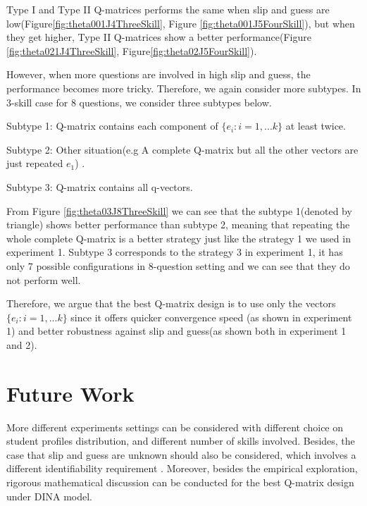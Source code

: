\documentclass{edm_template}
\begin{document}
Type I and Type II Q-matrices performs the same when slip and guess are low(Figure\ref{fig:theta001J4ThreeSkill}, Figure \ref{fig:theta001J5FourSkill}), but when they get higher, Type II Q-matrices show a better performance(Figure \ref{fig:theta021J4ThreeSkill}, Figure\ref{fig:theta02J5FourSkill}).

However, when more questions are involved in high slip and guess, the performance becomes more tricky. Therefore, we again consider more subtypes. In 3-skill case for 8 questions, we consider three subtypes below. 

Subtype 1: Q-matrix contains each component of $\{e_{i}:i=1,...k\}$ at least twice. 

Subtype 2: Other situation(e.g A complete Q-matrix but all the other vectors are just repeated $e_1$)
.

Subtype 3: Q-matrix contains all q-vectors.

From Figure \ref{fig:theta03J8ThreeSkill} we can see that the subtype 1(denoted by triangle) shows better performance than subtype 2, meaning that repeating the whole complete Q-matrix is a better strategy just like the strategy 1 we used in experiment 1. Subtype 3 corresponds to the strategy 3 in experiment 1, it has only 7 possible configurations in 8-question setting and we can see that they do not perform well.

Therefore, we argue that the best Q-matrix design is to use only the vectors $\{e_{i}:i=1,...k\}$ since it offers quicker convergence speed (as shown in experiment 1) and better robustness against slip and guess(as shown both in experiment 1 and 2).

\section{Future Work}
More different experiments settings can be considered with different choice on student profiles distribution, and different number of skills involved. Besides, the case that slip and guess are unknown should also be considered, which involves a different identifiability requirement \cite{xu2015identifiability}. Moreover, besides the empirical exploration, rigorous mathematical discussion can be conducted for the best Q-matrix design under DINA model. 


\end{document}
